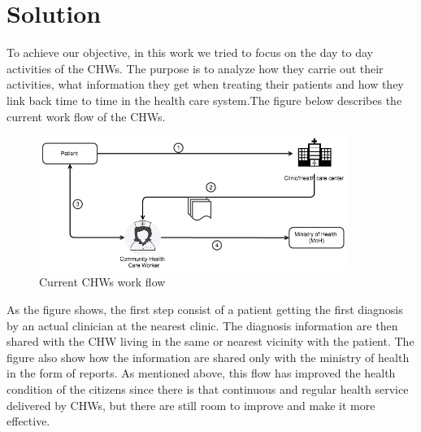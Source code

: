 \chapter{Solution}

To achieve our objective, in this work we tried to focus on the day to day activities of the CHWs. The purpose is to analyze how they carrie out their activities, what information they get when treating their patients and how they link back time to time in the health care system.The figure below describes the current work flow of the CHWs.

\begin{figure}[H]
\centering
\includegraphics[width=10cm]{images/current_situation.png} %
\caption{Current CHWs work flow}
\label{fig:fig-eg}  
\end{figure}

As the figure shows, the first step consist of a patient getting the first diagnosis by an actual clinician at the nearest clinic. The diagnosis information are then shared with the CHW living in the same or nearest vicinity with the patient. The figure also show how the information are shared only with the ministry of health in the form of reports. As mentioned above, this flow has improved the health condition of the citizens since there is that continuous and regular health service delivered by CHWs,  but there are still room to improve and make it more effective.

